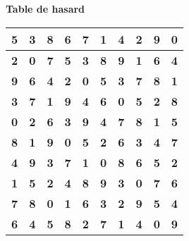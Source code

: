 \documentclass[11pt]{book}
\begin{document}
\pagestyle{endmatterstyle}
\begin{center}
  \textbf{\Large Table de hasard}\\[1.6cm]
  {
    \renewcommand\arraystretch{2.6}
    \begin{tabular}{|c|c|c|c|c|c|c|c|c|c|}
      \hline
      \huge\textbf{5} & \huge\textbf{3} & \huge\textbf{8} & \huge\textbf{6} & \huge\textbf{7} & \huge\textbf{1} & \huge\textbf{4} & \huge\textbf{2} & \huge\textbf{9} & \huge\textbf{0} \\ \hline
      \huge\textbf{2} & \huge\textbf{0} & \huge\textbf{7} & \huge\textbf{5} & \huge\textbf{3} & \huge\textbf{8} & \huge\textbf{9} & \huge\textbf{1} & \huge\textbf{6} & \huge\textbf{4} \\ \hline
      \huge\textbf{9} & \huge\textbf{6} & \huge\textbf{4} & \huge\textbf{2} & \huge\textbf{0} & \huge\textbf{5} & \huge\textbf{3} & \huge\textbf{7} & \huge\textbf{8} & \huge\textbf{1} \\ \hline
      \huge\textbf{3} & \huge\textbf{7} & \huge\textbf{1} & \huge\textbf{9} & \huge\textbf{4} & \huge\textbf{6} & \huge\textbf{0} & \huge\textbf{5} & \huge\textbf{2} & \huge\textbf{8} \\ \hline
      \huge\textbf{0} & \huge\textbf{2} & \huge\textbf{6} & \huge\textbf{3} & \huge\textbf{9} & \huge\textbf{4} & \huge\textbf{7} & \huge\textbf{8} & \huge\textbf{1} & \huge\textbf{5} \\ \hline
      \huge\textbf{8} & \huge\textbf{1} & \huge\textbf{9} & \huge\textbf{0} & \huge\textbf{5} & \huge\textbf{2} & \huge\textbf{6} & \huge\textbf{3} & \huge\textbf{4} & \huge\textbf{7} \\ \hline
      \huge\textbf{4} & \huge\textbf{9} & \huge\textbf{3} & \huge\textbf{7} & \huge\textbf{1} & \huge\textbf{0} & \huge\textbf{8} & \huge\textbf{6} & \huge\textbf{5} & \huge\textbf{2} \\ \hline
      \huge\textbf{1} & \huge\textbf{5} & \huge\textbf{2} & \huge\textbf{4} & \huge\textbf{8} & \huge\textbf{9} & \huge\textbf{3} & \huge\textbf{0} & \huge\textbf{7} & \huge\textbf{6} \\ \hline
      \huge\textbf{7} & \huge\textbf{8} & \huge\textbf{0} & \huge\textbf{1} & \huge\textbf{6} & \huge\textbf{3} & \huge\textbf{2} & \huge\textbf{9} & \huge\textbf{5} & \huge\textbf{4} \\ \hline
      \huge\textbf{6} & \huge\textbf{4} & \huge\textbf{5} & \huge\textbf{8} & \huge\textbf{2} & \huge\textbf{7} & \huge\textbf{1} & \huge\textbf{4} & \huge\textbf{0} & \huge\textbf{9} \\ \hline
    \end{tabular}
  }
\end{center}
    
\end{document}

